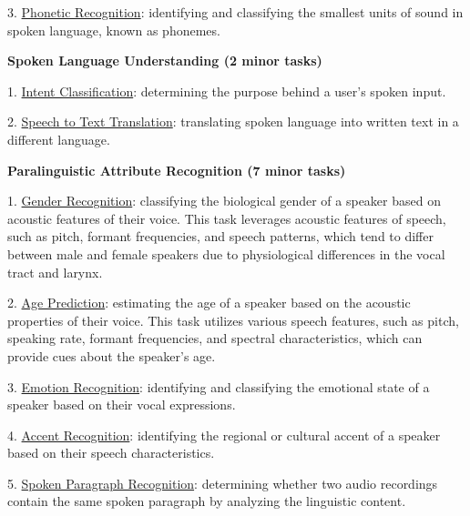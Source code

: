 3. \underline{Phonetic Recognition}: identifying and classifying the smallest units of sound in spoken language, known as phonemes. 






\textbf{Spoken Language Understanding (2 minor tasks)}

1. \underline{Intent Classification}: determining the purpose behind a user's spoken input.

2. \underline{Speech to Text Translation}: translating spoken language into written text in a different language.


\textbf{Paralinguistic Attribute Recognition (7 minor tasks)}

1. \underline{Gender Recognition}: classifying the biological gender of a speaker based on acoustic features of their voice. This task leverages acoustic features of speech, such as pitch, formant frequencies, and speech patterns, which tend to differ between male and female speakers due to physiological differences in the vocal tract and larynx.

2. \underline{Age Prediction}: estimating the age of a speaker based on the acoustic properties of their voice. This task utilizes various speech features, such as pitch, speaking rate, formant frequencies, and spectral characteristics, which can provide cues about the speaker's age. 

3. \underline{Emotion Recognition}: identifying and classifying the emotional state of a speaker based on their vocal expressions. 

4. \underline{Accent Recognition}: identifying the regional or cultural accent of a speaker based on their speech characteristics.

5. \underline{Spoken Paragraph Recognition}: determining whether two audio recordings contain the same spoken paragraph by analyzing the linguistic content.

